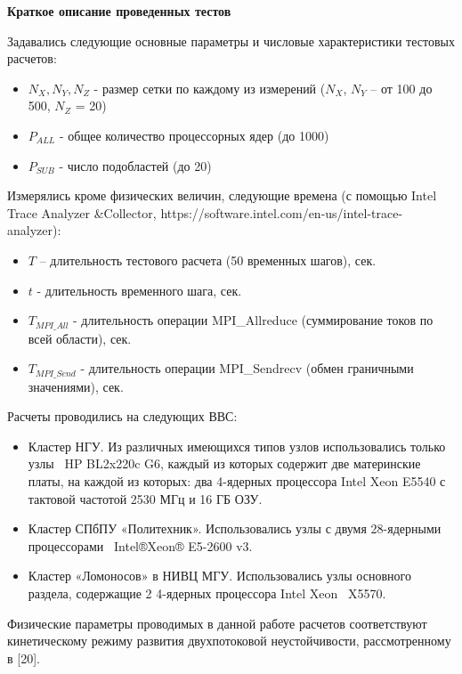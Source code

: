         \textbf{Краткое описание проведенных тестов}
        
        Задавались следующие основные параметры и числовые характеристики тестовых расчетов:
         \begin{itemize} 
        \item $N_X, N_Y, N_Z$  - размер сетки по каждому из измерений ($N_X$, $N_Y$ – от 100 до 500, $N_Z$ = 20)
        \item $P_{ALL}$  - общее количество процессорных ядер (до 1000)
        \item $P_{SUB}$  - число подобластей (до 20)
         \end{itemize} 
        Измерялись кроме физических величин, следующие времена (с помощью Intel Trace Analyzer \&Collector, https://software.intel.com/en-us/intel-trace-analyzer):
         \begin{itemize} 
        \item $T$ – длительность тестового расчета (50 временных шагов), сек.
       \item  $t$  - длительность временного шага, сек.
        \item $T_{MPI\_All}$ - длительность операции MPI\_Allreduce (суммирование токов по всей области), сек.
        \item $T_{MPI\_Send}$ - длительность операции MPI\_Sendrecv (обмен граничными значениями), сек.
        \end{itemize}
        
        
        
        Расчеты проводились на следующих ВВС:
        \begin{itemize}
        \item Кластер НГУ. Из различных имеющихся типов узлов использовались только узлы  HP BL2x220c G6, каждый из которых содержит две материнские платы, на каждой из которых: два 4-ядерных процессора Intel Xeon E5540 с тактовой частотой 2530 МГц и 16 ГБ ОЗУ.
        \item Кластер СПбПУ «Политехник». Использовались узлы с двумя 28-ядерными процессорами  Intel®Xeon® E5-2600 v3.
        \item Кластер «Ломоносов» в НИВЦ МГУ. Использовались узлы основного раздела, содержащие 2 4-ядерных процессора Intel Xeon  X5570. 
        \end{itemize}
        
        Физические параметры проводимых в данной работе расчетов соответствуют кинетическому режиму развития двухпотоковой неустойчивости, рассмотренному в [20].
        

